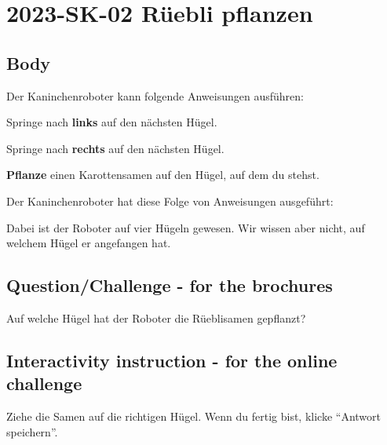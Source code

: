 \documentclass[a4paper,11pt]{report}
\newcommand{\taskGraphicsFolder}{..}
\begin{document}
\section*{\centering{} 2023-SK-02 Rüebli pflanzen}


\subsection*{Body}

Der Kaninchenroboter kann folgende Anweisungen ausführen:

\raisebox{-0.5ex}{} Springe nach \textbf{links} auf den nächsten Hügel.

\raisebox{-0.5ex}{} Springe nach \textbf{rechts} auf den nächsten Hügel.

\raisebox{-0.5ex}{} \textbf{Pflanze} einen Karottensamen auf den Hügel, auf dem du stehst.

Der Kaninchenroboter hat diese Folge von Anweisungen ausgeführt:

{\centering%
\par}

Dabei ist der Roboter auf vier Hügeln gewesen.
Wir wissen aber nicht, auf welchem Hügel er angefangen hat.

{\em


\subsection*{Question/Challenge - for the brochures}

Auf welche Hügel hat der Roboter die Rüeblisamen gepflanzt?

{\centering%
\par}

}


\subsection*{Interactivity instruction - for the online challenge}

Ziehe die Samen auf die richtigen Hügel. Wenn du fertig bist, klicke \enquote{Antwort speichern}.
\end{document}
